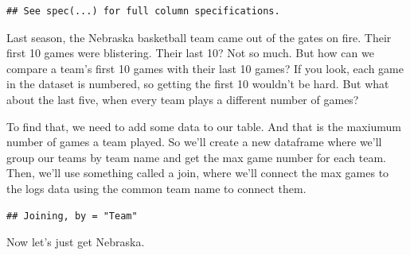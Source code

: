 \documentclass[]{book}
\newenvironment{Shaded}{\begin{snugshade}}{\end{snugshade}}
\newcommand{\KeywordTok}[1]{\textcolor[rgb]{0.13,0.29,0.53}{\textbf{#1}}}
\newcommand{\DataTypeTok}[1]{\textcolor[rgb]{0.13,0.29,0.53}{#1}}
\newcommand{\StringTok}[1]{\textcolor[rgb]{0.31,0.60,0.02}{#1}}
\newcommand{\OperatorTok}[1]{\textcolor[rgb]{0.81,0.36,0.00}{\textbf{#1}}}
\newcommand{\NormalTok}[1]{#1}
\begin{document}
\begin{verbatim}
## See spec(...) for full column specifications.
\end{verbatim}

Last season, the Nebraska basketball team came out of the gates on fire.
Their first 10 games were blistering. Their last 10? Not so much. But
how can we compare a team's first 10 games with their last 10 games? If
you look, each game in the dataset is numbered, so getting the first 10
wouldn't be hard. But what about the last five, when every team plays a
different number of games?

To find that, we need to add some data to our table. And that is the
maxiumum number of games a team played. So we'll create a new dataframe
where we'll group our teams by team name and get the max game number for
each team. Then, we'll use something called a join, where we'll connect
the max games to the logs data using the common team name to connect
them.

\begin{Shaded}
\end{Shaded}

\begin{Shaded}
\end{Shaded}

\begin{verbatim}
## Joining, by = "Team"
\end{verbatim}

Now let's just get Nebraska.

\begin{Shaded}
\end{Shaded}
\end{document}
